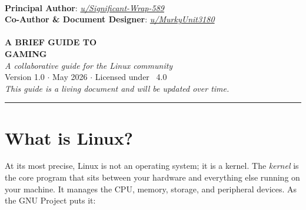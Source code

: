 \documentclass{article}
\begin{document}
 
 \begin{titlepage}

\begin{center}
\hspace{0pt}\\
\vspace{4cm}
{\Large \textbf{Principal Author}: \textit{\href{https://www.reddit.com/u/Significant-Wrap-589/s/LexVz3vvN0}{u/Significant-Wrap-589}}}\\[5pt]
{\Large \textbf{Co-Author \& Document Designer}: \textit{\href{https://www.reddit.com/u/MurkyUnit3180/s/QuyAn31plr}{u/MurkyUnit3180}}}\\[3cm]
{}\\
\vspace{0.8cm}
{\LARGE\bfseries A BRIEF GUIDE TO}\\[10pt]
{\LARGE\bfseries GAMING}\\

\vfill
    {\normalsize\itshape A collaborative guide for the Linux community}\\[4pt]
    {\small Version 1.0 \(\cdot\) May 2026 \(\cdot\) Licensed under \ccbysa~4.0} \\[2pt]
    {\small\textit{This guide is a living document and will be updated over time.}}
\end{center}
\end{titlepage}

\clearpage
{}
{}
\tableofcontents
\vspace{1em} 
\hrule
\clearpage

\section{What is Linux?}

At its most precise, Linux is not an operating system; it is a kernel. The \textit{kernel} is the core program that sits between your hardware and everything else running on your machine. It manages the CPU, memory, storage, and peripheral devices. As the GNU Project puts it:
\end{document}
